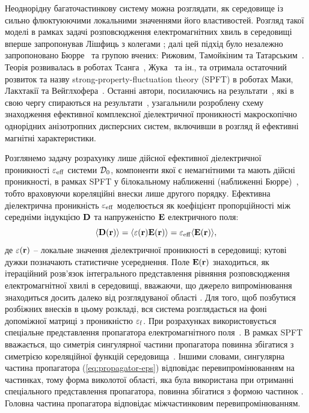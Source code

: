 \documentclass[14pt,twoside]{vakthesis}
\begin{document}
Неоднорідну багаточастинкову систему можна розглядати, як середовище із сильно флюктуюючими локальними значеннями його властивостей. Розгляд такої моделі в рамках задачі розповсюдження електромагнітних хвиль в середовищі вперше запропонував Лішфиць з колегами \cite{Lifshitz1950}; далі цей підхід було незалежно запропоновано
Бюрре~\cite{Bourret1962} та групою вчених: Рижовим, Тамойкіним та Татарським~\cite{Ryzhov1965,
RyzhovRev}. Теорія розвивалась в роботах Тсанга~\cite{Tsang1981}, Жука~\cite{Zhuk1994} та ін., та отримала остаточний розвиток та назву strong-property-fluctuation theory (SPFT) в роботах Маки, Лакхтакії та Вейглхофера~\cite{Michel1995,Mackay2000, Mackay2001}.
Останні автори, посилаючись на результати~\cite{Tsang1981}, які в свою чергу спираються на результати~\cite{Ryzhov1965, RyzhovRev}, узагальнили  розроблену схему знаходження ефективної комплексної діелектричної проникності макроскопічно однорідних анізотропних дисперсних систем, включивши в розгляд й ефективні магнітні характеристики.

Розглянемо задачу розрахунку лише дійсної ефективної діелектричної проникності ${\varepsilon}_{\rm eff}$ системи ${\cal D}_0$, компоненти якої є немагнітними та мають дійсні проникності, в рамках SPFT у білокальному наближенні (наближенні Бюрре)~\cite{Tsang1981,RyzhovRev}, тобто враховуючи кореляційні внески лише другого порядку.
Ефективна діелектрична проникність ${\varepsilon}_{\rm eff}$ моделюється як коефіцієнт пропорційності між середніми індукцією ${\bf D}$ та напруженістю ${\bf E}$ електричного поля:
\begin{equation}\label{eq:eps-eff-def}
 \langle {\bf D} ({\bf r}) \rangle = \langle {\varepsilon} ({\bf r}) {\bf E} ({\bf r}) \rangle
 = {\varepsilon}_{\rm eff} \langle {\bf E} ({\bf r}) \rangle,
\end{equation}
де ${\varepsilon} ({\bf r})$ -- локальне значення діелектричної
проникності в середовищі; кутові дужки позначають статистичне 
усереднення. Поле ${\bf E} ({\bf r})$ знаходиться, як ітераційний розв'язок інтегрального представлення рівняння розповсюдження електромагнітної хвилі в середовищі, вважаючи, що джерело випромінювання знаходиться досить далеко від розглядуваної області \cite{Ryzhov1965,Tsang1981}. Для того, щоб позбутися розбіжних внесків в цьому розкладі, вся система розглядається на фоні допоміжної матриці з проникністю $\varepsilon_{\rm f}$.
При розрахунках використовується спеціальне представлення пропагатора електромагнітного поля~\cite{Ryzhov1965, Weighofer1989, Weiglhofer1995, Sushko2004}. 
В рамках SPFT вважається, що симетрія сингулярної частини пропагатора повинна збігатися з симетрією кореляційної функцій середовища~\cite{Tsang1981}. Іншими словами, сингулярна частина пропагатора (\ref{eq:propagator-eps}) відповідає перевипромінюванням на частинках, тому форма виколотої області, яка була використана при отриманні спеціального представлення пропагатора, повинна збігатися з формою частинок \cite{Mackay2000}. Головна частина пропагатора відповідає міжчастинковим перевипромінюванням.
\end{document}

